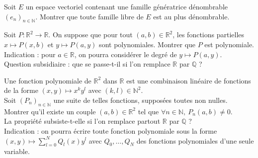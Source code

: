 \documentclass[french]{article}
\newcommand{\N}{\mathbb{N}}
\newcommand{\Q}{\mathbb{Q}}
\newcommand{\R}{\mathbb{R}}
\theoremstyle{plain}
\theoremstyle{definition}
\theoremstyle{remark}
\begin{document}
\begin{exo}
	Soit $E$ un espace vectoriel contenant une famille génératrice dénombrable $(e_n)_{n\in\N}$. Montrer que toute famille libre de $E$ est au plus dénombrable.
\end{exo}

\begin{exo}
	Soit $P:\R^2\to\R$. On suppose que pour tout $(a,b)\in\R^2$, les fonctions partielles $x\mapsto P(x,b)$ et $y\mapsto P(a,y)$ sont polynomiales. Montrer que $P$ est polynomiale. \\
	Indication : pour $a\in\R$, on pourra considérer le degré de $y\mapsto P(a,y)$. \\
	Question subsidiaire : que se passe-t-il si l'on remplace $\R$ par $\Q$ ?
\end{exo}

\begin{exo}
	Une fonction polynomiale de $\R^2$ dans $\R$ est une combinaison linéaire de fonctions de la forme $(x,y)\mapsto x^ky^l$ avec $(k,l)\in\N^2$.\\
	Soit $(P_n)_{n\in\N}$ une suite de telles fonctions, supposées toutes non nulles. Montrer qu'il existe un couple $(a,b)\in\R^2$ tel que $\forall n\in\N,\ P_n(a,b)\ne 0$.\\
	La propriété subsiste-t-elle si l'on remplace partout $\R$ par $\Q$ ? \\
	Indication : on pourra écrire toute fonction polynomiale sous la forme $(x,y)\mapsto\displaystyle\sum_{l=0}^{N}Q_l(x)y^l$ avec $Q_0,\ldots,Q_N$ des fonctions polynomiales d'une seule variable.
\end{exo}
\end{document}
